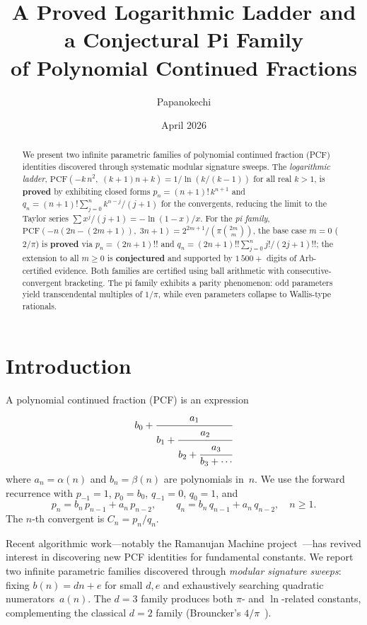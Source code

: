 \documentclass[11pt,a4paper]{article}
\title{A Proved Logarithmic Ladder and a Conjectural Pi Family\\
of Polynomial Continued Fractions}
\author{Papanokechi}
\date{April 2026}
\theoremstyle{plain}
\theoremstyle{remark}
\newcommand{\PCF}{\mathrm{PCF}}
\begin{document}
\maketitle

\begin{abstract}
We present two infinite parametric families of polynomial continued fraction
(PCF) identities discovered through systematic modular signature sweeps.
The \emph{logarithmic ladder},
$\PCF(-k\,n^2,\;(k{+}1)n{+}k) = 1/\ln(k/(k{-}1))$
for all real $k > 1$,
is \textbf{proved} by exhibiting closed forms
$p_n = (n{+}1)!\,k^{n+1}$ and
$q_n = (n{+}1)!\sum_{j=0}^n k^{n-j}/(j{+}1)$
for the convergents, reducing the limit to the Taylor series
$\sum x^j/(j{+}1) = -\ln(1{-}x)/x$.
For the \emph{pi family},
$\PCF(-n(2n{-}(2m{+}1)),\;3n{+}1) = 2^{2m+1}/(\pi\binom{2m}{m})$,
the base case $m=0$ ($2/\pi$) is \textbf{proved} via
$p_n = (2n{+}1)!!$ and
$q_n = (2n{+}1)!!\sum_{j=0}^n j!/(2j{+}1)!!$;
the extension to all $m \ge 0$ is \textbf{conjectured}
and supported by $1\,500{+}$ digits of Arb-certified evidence.
Both families are certified using ball arithmetic with
consecutive-convergent bracketing.
The pi family exhibits a parity phenomenon: odd parameters yield
transcendental multiples of $1/\pi$, while even parameters collapse
to Wallis-type rationals.
\end{abstract}

\section{Introduction}

A polynomial continued fraction (PCF) is an expression
\begin{equation}\label{eq:pcf}
  b_0 + \cfrac{a_1}{b_1 + \cfrac{a_2}{b_2 + \cfrac{a_3}{b_3 + \cdots}}}
\end{equation}
where $a_n = \alpha(n)$ and $b_n = \beta(n)$ are polynomials in~$n$.
We use the forward recurrence with
$p_{-1} = 1$, $p_0 = b_0$, $q_{-1} = 0$, $q_0 = 1$, and
\begin{equation}\label{eq:rec}
  p_n = b_n\,p_{n-1} + a_n\,p_{n-2}, \qquad
  q_n = b_n\,q_{n-1} + a_n\,q_{n-2},
  \quad n \ge 1.
\end{equation}
The $n$-th convergent is $C_n = p_n/q_n$.

Recent algorithmic work---notably the Ramanujan Machine
project~\cite{raayoni2021,elimelech2024}---has revived interest in
discovering new PCF identities for fundamental constants.
We report two infinite parametric families discovered through
\emph{modular signature sweeps}: fixing $b(n) = dn + e$ for small
$d,e$ and exhaustively searching quadratic numerators~$a(n)$.
The $d{=}3$ family produces both $\pi$- and $\ln$-related constants,
complementing the classical $d{=}2$ family
(Brouncker's $4/\pi$~\cite{osler2010}).
\end{document}
